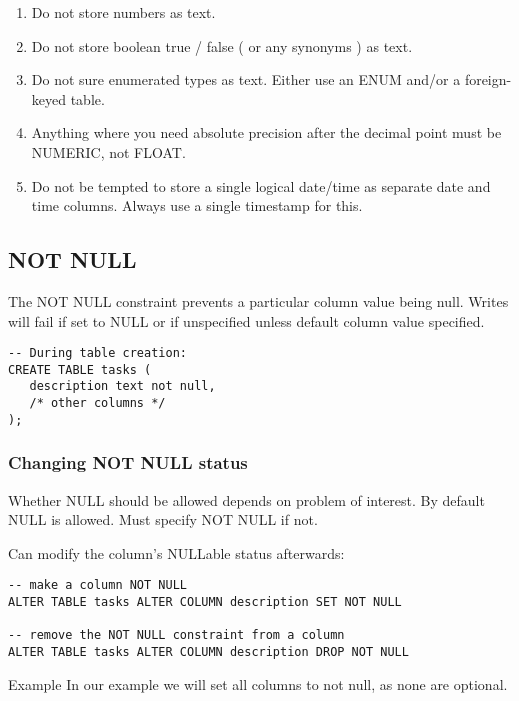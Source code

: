 \documentclass[slides]{pgnotes}
\begin{document}
\begin{enumerate}
  
\item Do not store numbers as text.

\item Do not store boolean true / false ( or any synonyms ) as text.

\item Do not sure enumerated types as text. Either use an ENUM and/or a foreign-keyed table.

\item Anything where you need absolute precision after the decimal point must be NUMERIC, not FLOAT. 
  
\item Do not be tempted to store a single logical date/time as separate date and time columns.
  Always use a single timestamp for this. 
  
\end{enumerate}


\subsection{NOT NULL}\label{not-null}

The NOT NULL constraint prevents a particular column value being null.
Writes will fail if set to NULL or if unspecified unless default column value specified.

\begin{verbatim}
-- During table creation:
CREATE TABLE tasks (
   description text not null,
   /* other columns */
);
\end{verbatim}

\newpage
\subsubsection{Changing NOT NULL status}

Whether NULL should be allowed depends on problem of interest.
By default NULL is allowed.
Must specify NOT NULL if not.

Can modify the column's NULLable status afterwards:
\begin{verbatim}
-- make a column NOT NULL
ALTER TABLE tasks ALTER COLUMN description SET NOT NULL

-- remove the NOT NULL constraint from a column
ALTER TABLE tasks ALTER COLUMN description DROP NOT NULL
\end{verbatim}

\begin{greenbox}{Example}
  In our example we will set all columns to not null, as none are optional.
\end{greenbox}
\end{document}
